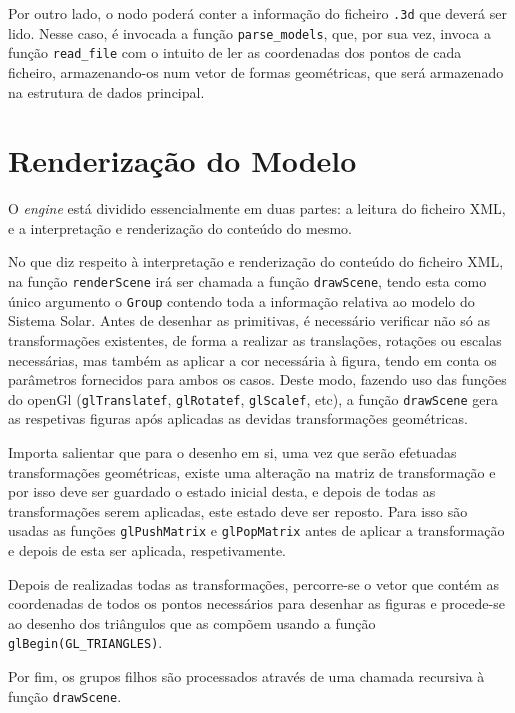 \documentclass[a4paper, 11pt]{article}
\begin{document}
Por outro lado, o nodo poderá conter a informação do ficheiro \texttt{.3d} que deverá
ser lido. Nesse caso, é invocada a função \texttt{parse\_models}, que, por sua vez,
invoca a função \texttt{read\_file} com o intuito de ler as coordenadas dos pontos de
cada ficheiro, armazenando-os num vetor de formas geométricas, que será armazenado na
estrutura de dados principal.

\pagebreak

\section{Renderização do Modelo}

O \textit{engine} está dividido essencialmente em duas partes: a leitura do ficheiro XML,
e a interpretação e renderização do conteúdo do mesmo.

No que diz respeito à interpretação e renderização do conteúdo do ficheiro XML, na
função \texttt{renderScene} irá ser chamada a função \texttt{drawScene}, tendo esta
como único argumento o \texttt{Group} contendo toda a informação relativa ao modelo
do Sistema Solar. Antes de desenhar as primitivas, é necessário verificar não só
as transformações existentes, de forma a realizar as translações, rotações ou escalas
necessárias, mas também as aplicar a cor necessária à figura, tendo em conta os parâmetros
fornecidos para ambos os casos. Deste modo, fazendo uso das funções do openGl
(\texttt{glTranslatef}, \texttt{glRotatef}, \texttt{glScalef}, etc), a função \texttt{drawScene}
gera as respetivas figuras após aplicadas as devidas transformações geométricas.

Importa salientar que para o desenho em si, uma vez que serão efetuadas transformações
geométricas, existe uma alteração na matriz de transformação e por isso deve ser guardado
o estado inicial desta, e depois de todas as transformações serem aplicadas, este
estado deve ser reposto. Para isso são usadas as funções \texttt{glPushMatrix} e
\texttt{glPopMatrix} antes de aplicar a transformação e depois de esta ser aplicada, 
respetivamente. 

Depois de realizadas todas as transformações, percorre-se o vetor que contém as
coordenadas de todos os pontos necessários para desenhar as figuras e procede-se
ao desenho dos triângulos que as compõem usando a função \texttt{glBegin(GL\_TRIANGLES)}. 

Por fim, os grupos filhos são processados através de uma chamada recursiva à função
\texttt{drawScene}.
\end{document}
